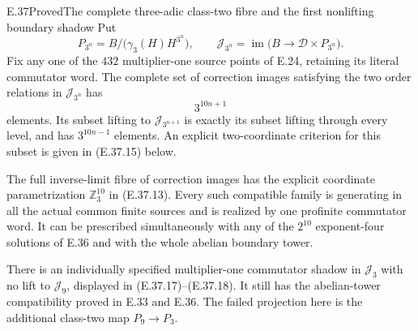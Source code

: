 \begin{statement}{E.37}{Proved}{The complete three-adic class-two fibre and the first nonlifting boundary shadow}
Put
\[
 P_{3^n}=B/\bigl(\gamma_3(H)H^{3^n}\bigr),\qquad
 \mathscr J_{3^n}=\operatorname{im}
       \bigl(B\longrightarrow\mathscr D\times P_{3^n}\bigr).
 \tag{E.37.1}
\]
Fix any one of the $432$ multiplier-one source points
of E.24, retaining its literal commutator word.
The complete set of correction images satisfying the
two order relations in $\mathscr J_{3^n}$ has
\[
                         3^{10n+1}
 \tag{E.37.2}
\]
elements.  Its subset lifting to $\mathscr J_{3^{n+1}}$
is exactly its subset lifting through every level,
and has $3^{10n-1}$ elements.
An explicit two-coordinate criterion for this subset
is given in \textup{(E.37.15)} below.

The full inverse-limit fibre of correction images
has the explicit coordinate parametrization
$\mathbb Z_3^{10}$ in \textup{(E.37.13)}.
Every such compatible family is generating in all
the actual common finite sources and is realized
by one profinite commutator word.  It can be prescribed
simultaneously with any of the $2^{10}$ exponent-four
solutions of E.36 and with the whole abelian boundary
tower.

There is an individually specified multiplier-one
commutator shadow in $\mathscr J_3$ with no lift to
$\mathscr J_9$, displayed in
\textup{(E.37.17)--(E.37.18)}.
It still has the abelian-tower compatibility proved
in E.33 and E.36.  The failed projection here is the
additional class-two map $P_9\to P_3$.
\end{statement}
